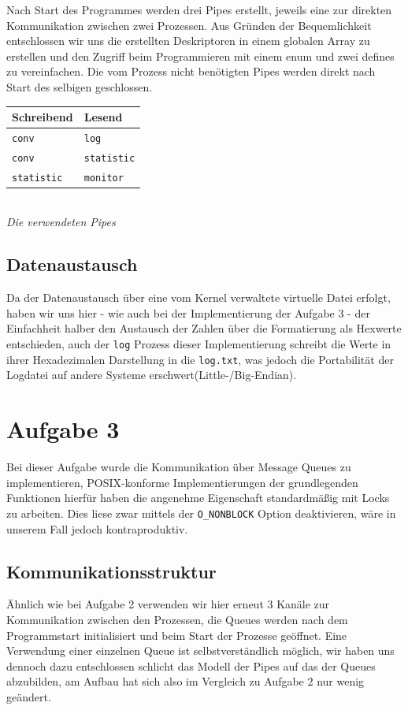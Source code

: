 \documentclass[12pt, a4paper]{scrartcl}
\begin{document}
Nach Start des Programmes werden drei Pipes erstellt, jeweils eine zur direkten
Kommunikation zwischen zwei Prozessen. Aus Gründen der Bequemlichkeit entschlossen 
wir uns die erstellten Deskriptoren in einem globalen Array zu erstellen und den
Zugriff beim Programmieren mit einem enum und zwei defines zu vereinfachen. Die
vom Prozess nicht benötigten Pipes werden direkt nach Start des selbigen geschlossen.\\

\begin{center}
\begin{tabular}{|l|l|}
\hline
	\textbf{Schreibend} & \textbf{Lesend} \\
\hline
	\texttt{conv} & \texttt{log} \\
\hline
	\texttt{conv} & \texttt{statistic} \\
\hline
	\texttt{statistic} & \texttt{monitor}\\
\hline
\end{tabular}\\
\textit{Die verwendeten Pipes}
\end{center}

\subsection{Datenaustausch}
Da der Datenaustausch über eine vom Kernel verwaltete virtuelle Datei erfolgt,
haben wir uns hier - wie auch bei der Implementierung der Aufgabe 3 - der
Einfachheit halber den Austausch der Zahlen über die Formatierung als Hexwerte
entschieden, auch der \texttt{log} Prozess dieser Implementierung schreibt die
Werte in ihrer Hexadezimalen Darstellung in die \texttt{log.txt}, was jedoch die
Portabilität der Logdatei auf andere Systeme erschwert(Little-/Big-Endian).

\clearpage
\section{Aufgabe 3}

Bei dieser Aufgabe wurde die Kommunikation über Message Queues zu implementieren,
POSIX-konforme Implementierungen der grundlegenden Funktionen hierfür haben die
angenehme Eigenschaft standardmäßig mit Locks zu arbeiten. Dies liese zwar mittels 
der \texttt{O\_NONBLOCK} Option deaktivieren, wäre in unserem Fall jedoch 
kontraproduktiv.

\subsection{Kommunikationsstruktur}
Ähnlich wie bei Aufgabe 2 verwenden wir hier erneut 3 Kanäle zur Kommunikation
zwischen den Prozessen, die Queues werden nach dem Programmstart initialisiert
und beim Start der Prozesse geöffnet. Eine Verwendung einer einzelnen Queue ist
selbstverständlich möglich, wir haben uns dennoch dazu entschlossen schlicht das
Modell der Pipes auf das der Queues abzubilden, am Aufbau hat sich also im Vergleich
zu Aufgabe 2 nur wenig geändert.
\np
\end{document}
